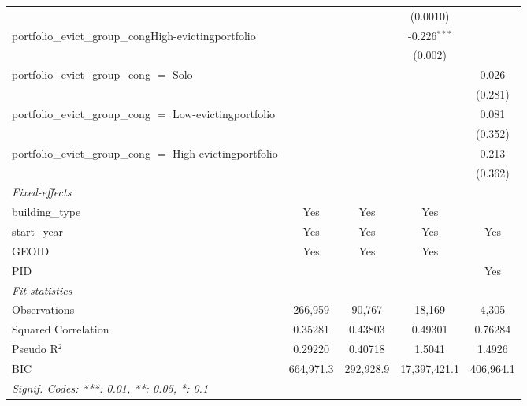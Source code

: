 \documentclass[
  11pt,
]{article}
\begin{document}
\begin{center}
{\begin{tabular}{lcccc}
                                                               &                &                & (0.0010)       &   \\   
   portfolio\_evict\_group\_congHigh-evictingportfolio         &                &                & -0.226$^{***}$ &   \\   
                                                               &                &                & (0.002)        &   \\   
   portfolio\_evict\_group\_cong $=$ Solo                      &                &                &                & 0.026\\   
                                                               &                &                &                & (0.281)\\   
   portfolio\_evict\_group\_cong $=$ Low-evictingportfolio     &                &                &                & 0.081\\   
                                                               &                &                &                & (0.352)\\   
   portfolio\_evict\_group\_cong $=$ High-evictingportfolio    &                &                &                & 0.213\\   
                                                               &                &                &                & (0.362)\\   
   \midrule
   \emph{Fixed-effects}\\
   building\_type                                              & Yes            & Yes            & Yes            & \\  
   start\_year                                                 & Yes            & Yes            & Yes            & Yes\\  
   GEOID                                                       & Yes            & Yes            & Yes            & \\  
   PID                                                         &                &                &                & Yes\\  
   \midrule
   \emph{Fit statistics}\\
   Observations                                                & 266,959        & 90,767         & 18,169         & 4,305\\  
   Squared Correlation                                         & 0.35281        & 0.43803        & 0.49301        & 0.76284\\  
   Pseudo R$^2$                                                & 0.29220        & 0.40718        & 1.5041         & 1.4926\\  
   BIC                                                         & 664,971.3      & 292,928.9      & 17,397,421.1   & 406,964.1\\  
   \midrule \midrule
   \multicolumn{5}{l}{\emph{Signif. Codes: ***: 0.01, **: 0.05, *: 0.1}}\\
\end{tabular}
}
\end{center}
\end{document}
